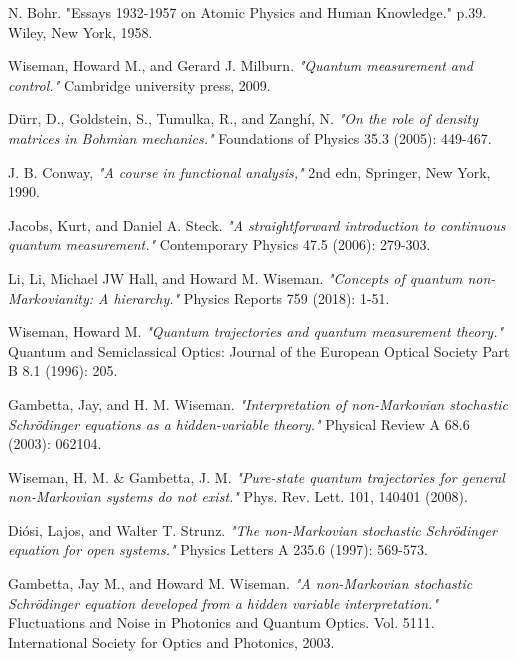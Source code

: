 \documentclass[11pt, a4paper]{article} %
\begin{document}
\begin{thebibliography}{1}
{
N. Bohr. {"Essays 1932-1957 on Atomic Physics and Human Knowledge."} p.39. Wiley, New York, 1958.


Wiseman, Howard M., and Gerard J. Milburn. {\em "Quantum measurement and control."} Cambridge university press, 2009.

Dürr, D., Goldstein, S., Tumulka, R., and Zanghí, N. {\em "On the role of density matrices in Bohmian mechanics."} Foundations of Physics 35.3 (2005): 449-467.

J. B. Conway, {\em "A course in functional analysis,"} 2nd edn, Springer, New York, 1990.

Jacobs, Kurt, and Daniel A. Steck. {\em "A straightforward introduction to continuous quantum measurement."} Contemporary Physics 47.5 (2006): 279-303.

Li, Li, Michael JW Hall, and Howard M. Wiseman. {\em "Concepts of quantum non-Markovianity: A hierarchy."} Physics Reports 759 (2018): 1-51.

Wiseman, Howard M. {\em "Quantum trajectories and quantum measurement theory."} Quantum and Semiclassical Optics: Journal of the European Optical Society Part B 8.1 (1996): 205.

Gambetta, Jay, and H. M. Wiseman. {\em "Interpretation of non-Markovian stochastic Schrödinger equations as a hidden-variable theory."} Physical Review A 68.6 (2003): 062104.

Wiseman, H. M. \& Gambetta, J. M. {\em "Pure-state quantum trajectories for general non-Markovian systems do not exist."} Phys. Rev. Lett. 101, 140401 (2008).

Diósi, Lajos, and Walter T. Strunz. {\em "The non-Markovian stochastic Schrödinger equation for open systems."} Physics Letters A 235.6 (1997): 569-573.

Gambetta, Jay M., and Howard M. Wiseman. {\em "A non-Markovian stochastic Schrödinger equation developed from a hidden variable interpretation."} Fluctuations and Noise in Photonics and Quantum Optics. Vol. 5111. International Society for Optics and Photonics, 2003.

}
\end{thebibliography}
\end{document}
